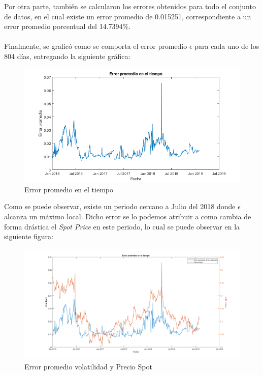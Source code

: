 \noindent Por otra parte, también se calcularon los errores obtenidos para todo el conjunto de datos, en el cual existe un error promedio de 0.015251, correspondiente a un error promedio porcentual del 14.7394\%.\\\\
\noindent Finalmente, se graficó como se comporta el error promedio $\epsilon$ para cada uno de los 804 días, entregando la siguiente gráfica:
\begin{figure}[H]
    \begin{center}
    \includegraphics[width = 14cm]{figures/ErrorPromedioVsTiempo.png}
    \caption{Error promedio en el tiempo}
    \label{errorpromedio} %
    \end{center}
\end{figure}

\noindent Como se puede observar, existe un periodo cercano a Julio del 2018 donde $\epsilon$ alcanza un máximo local. Dicho error se lo podemos atribuir a como cambia de forma drástica el \textit{Spot Price} en este periodo, lo cual se puede observar en la siguiente figura:
\begin{figure}[H]
    \begin{center}
    \includegraphics[width = 14cm]{figures/Errorpromediovolatilidad.png}
    \caption{Error promedio volatilidad y Precio Spot}
    \label{error4} %
    \end{center}
\end{figure}
\newpage


